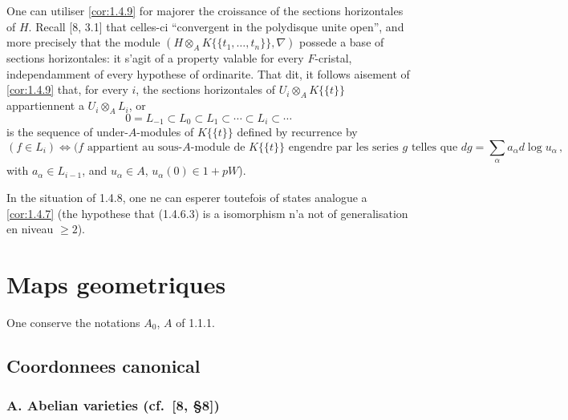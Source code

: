 \documentclass[12pt,a4paper]{article}
\theoremstyle{plain}
\theoremstyle{definition}
\theoremstyle{remark}
\begin{document}
One can utiliser \ref{cor:1.4.9} for majorer the croissance of the sections horizontales of $H$. Recall [8, 3.1] that celles-ci ``convergent in the polydisque unite open'', and more precisely that the module $(H \otimes_A K\{\{t_1, \ldots, t_n\}\}, \nabla)$ possede a base of sections horizontales: it s'agit of a property valable for every $F$-cristal, independamment of every hypothese of ordinarite. That dit, it follows aisement of \ref{cor:1.4.9} that, for every $i$, the sections horizontales of $U_i \otimes_A K\{\{t\}\}$ appartiennent a $U_i \otimes_A L_i$, or
\[
0 = L_{-1} \subset L_0 \subset L_1 \subset \cdots \subset L_i \subset \cdots
\]
is the sequence of under-$A$-modules of $K\{\{t\}\}$ defined by recurrence by
\[
(f \in L_i) \Longleftrightarrow (f \text{ appartient au sous-$A$-module de } K\{\{t\}\} \text{ engendre par les series } g \text{ telles que } dg = \sum_\alpha a_\alpha d\log u_\alpha\,,
\]
with $a_\alpha \in L_{i-1}$, and $u_\alpha \in A$, $u_\alpha(0) \in 1 + pW$).

In the situation of 1.4.8, one ne can esperer toutefois of states analogue a \ref{cor:1.4.7} (the hypothese that (1.4.6.3) is a isomorphism n'a not of generalisation en niveau $\geq 2$).

\section{Maps geometriques}

One conserve the notations $A_0$, $A$ of 1.1.1.

\subsection{Coordonnees canonical}

\subsubsection[A. Abelian varieties]{A. Abelian varieties ({cf.\ [8, \S 8]})}

\paragraph{}
\end{document}
